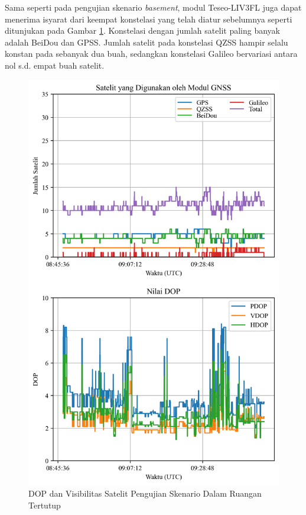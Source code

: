 Sama seperti pada pengujian skenario \textit{basement}, modul Teseo-LIV3FL juga dapat menerima isyarat dari keempat konstelasi yang telah diatur sebelumnya seperti ditunjukan pada Gambar \ref{Fig: indoor-sats_dop}. Konstelasi dengan jumlah satelit paling banyak adalah BeiDou dan GPSS. Jumlah satelit pada konstelasi QZSS hampir selalu konstan pada sebanyak dua buah, sedangkan konstelasi Galileo bervariasi antara nol s.d. empat buah satelit.

\begin{figure}[H]
	\centering
	\captionsetup{justification=centering}
	\includegraphics[width=12cm]{contents/chapter-4/2-skenario-indoor/sats_dop.png}
	\caption{DOP dan Visibilitas Satelit Pengujian Skenario Dalam Ruangan Tertutup}
	\label{Fig: indoor-sats_dop}
\end{figure}

